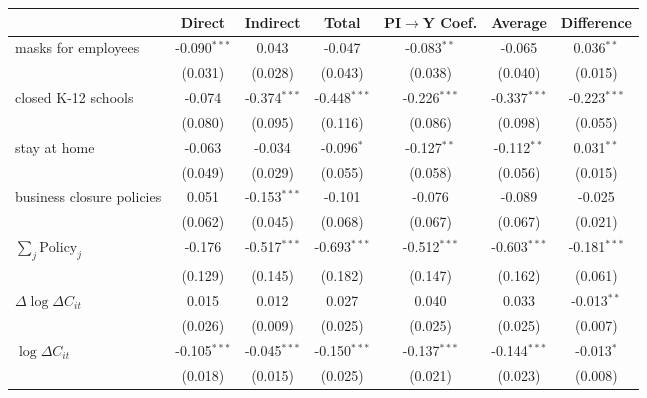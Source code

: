 
\begin{tabular}{lccccc|>{}c}
\toprule
  & Direct & Indirect & Total & PI$\to$Y Coef. & Average & Difference\\
\midrule
masks for employees & -0.090$^{***}$ & 0.043 & -0.047 & -0.083$^{**}$ & -0.065 & 0.036$^{**}$\\
 & (0.031) & (0.028) & (0.043) & (0.038) & (0.040) & (0.015)\\
closed K-12 schools & -0.074 & -0.374$^{***}$ & -0.448$^{***}$ & -0.226$^{***}$ & -0.337$^{***}$ & -0.223$^{***}$\\
 & (0.080) & (0.095) & (0.116) & (0.086) & (0.098) & (0.055)\\
stay at home & -0.063 & -0.034 & -0.096$^{*}$ & -0.127$^{**}$ & -0.112$^{**}$ & 0.031$^{**}$\\
 & (0.049) & (0.029) & (0.055) & (0.058) & (0.056) & (0.015)\\
business closure policies & 0.051 & -0.153$^{***}$ & -0.101 & -0.076 & -0.089 & -0.025\\
 & (0.062) & (0.045) & (0.068) & (0.067) & (0.067) & (0.021)\\
$\sum_j \mathrm{Policy}_j$ & -0.176 & -0.517$^{***}$ & -0.693$^{***}$ & -0.512$^{***}$ & -0.603$^{***}$ & -0.181$^{***}$\\
 & (0.129) & (0.145) & (0.182) & (0.147) & (0.162) & (0.061)\\
$\Delta \log \Delta C_{it}$ & 0.015 & 0.012 & 0.027 & 0.040 & 0.033 & -0.013$^{**}$\\
 & (0.026) & (0.009) & (0.025) & (0.025) & (0.025) & (0.007)\\
$\log \Delta C_{it}$ & -0.105$^{***}$ & -0.045$^{***}$ & -0.150$^{***}$ & -0.137$^{***}$ & -0.144$^{***}$ & -0.013$^{*}$\\
 & (0.018) & (0.015) & (0.025) & (0.021) & (0.023) & (0.008)\\
\bottomrule
\end{tabular}